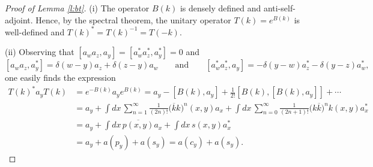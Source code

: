 \documentclass[11pt,a4paper,draft,DIV11]{scrartcl}	%
\newcommand{\N}{\mathcal{N}}
\begin{document}
\begin{proof}[Proof of Lemma \ref{l:bt}]
  (i) The operator $B(k)$ is densely defined and anti-self-adjoint.
  Hence, by the spectral theorem, the unitary operator $T(k) = e^{B(k)}$ is
  well-defined and $T(k)^* = T(k)^{-1} = T(-k)$.
\iffalse
  Let $\chi$ be the characteristic function, and consider a real number $M >
  0$. We give a proof of the formulae on the subspace $\chi(\N \le M)
  \mathcal{F}$, and then we indicate how to extend it to the whole
  $\mathcal{F}$. First, note that $B(k)$ and $a(f)$ are bounded operators on
  $\chi(\N \le M) \mathcal{F}$. Recall the formula
  \[
    e^X Y e^{-X} = Y + [X,Y] + \frac{1}{2!} [X,[X,Y]] + \cdots
  \]
\fi

  (ii) Observing that $[a_w a_z, a_y] = [a_w^* a_z^*, a_y^*] = 0$ and
  \[
    [a_w a_z, a_y^*] = \delta(w-y) a_z + \delta(z-y) a_w \qquad \text{and}
    \qquad [a_w^* a_z^*, a_y] = -\delta(y-w) a_z^* - \delta(y-z) a_w^*,
  \]
  one easily finds the expression
  \begin{align*}
    T(k)^* a_y T(k) & = e^{-B(k)} a_y e^{B(k)} = a_y - [B(k), a_y] +
    \frac{1}{2!} [B(k), [B(k), a_y]] + \cdots \\
    & = a_y + \int dx \, \sum_{n=1}^\infty \frac{1}{(2n)!} \big( 
    \overline{k} k \big)^n(x,y) a_x + \int dx \, \sum_{n=0}^\infty
    \frac{1}{(2n+1)!} \big( k \overline{k} \big)^n k(x,y) a_x^* \\
    & = a_y + \int dx \, \overline{p(x,y)} a_x + \int dx \, s(x,y) a_x^* \\
    & = a_y + a(p_y) + a(s_y) = a(c_y) + a(s_y).
  \end{align*}



\end{proof}
\end{document}
